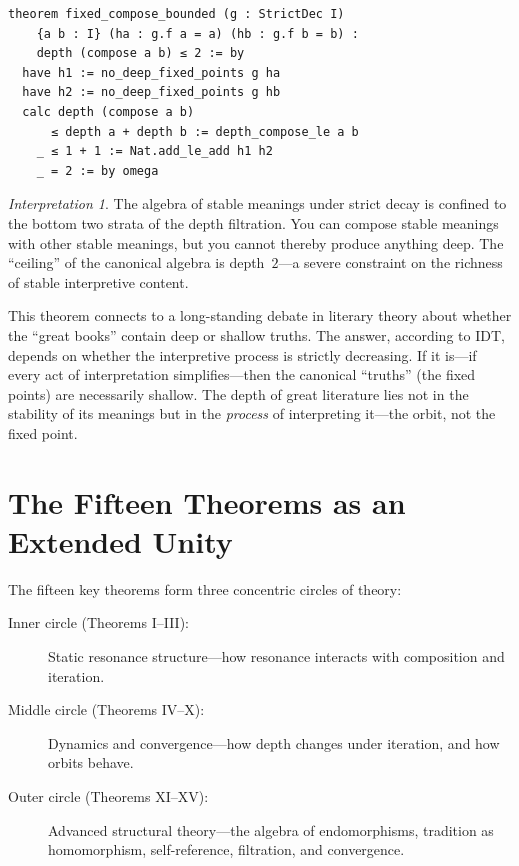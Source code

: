 \documentclass[11pt,openany]{book}
\theoremstyle{definition}
\theoremstyle{plain}
\theoremstyle{remark}
\newtheorem{interpretation}[axiom]{Interpretation}
\begin{document}
\begin{lstlisting}[language=Lean4]
theorem fixed_compose_bounded (g : StrictDec I)
    {a b : I} (ha : g.f a = a) (hb : g.f b = b) :
    depth (compose a b) ≤ 2 := by
  have h1 := no_deep_fixed_points g ha
  have h2 := no_deep_fixed_points g hb
  calc depth (compose a b)
      ≤ depth a + depth b := depth_compose_le a b
    _ ≤ 1 + 1 := Nat.add_le_add h1 h2
    _ = 2 := by omega
\end{lstlisting}

\begin{interpretation}
The algebra of stable meanings under strict decay is confined to the bottom two strata of the depth filtration. You can compose stable meanings with other stable meanings, but you cannot thereby produce anything deep. The ``ceiling'' of the canonical algebra is depth~$2$---a severe constraint on the richness of stable interpretive content.

This theorem connects to a long-standing debate in literary theory about whether the ``great books'' contain deep or shallow truths. The answer, according to IDT, depends on whether the interpretive process is strictly decreasing. If it is---if every act of interpretation simplifies---then the canonical ``truths'' (the fixed points) are necessarily shallow. The depth of great literature lies not in the stability of its meanings but in the \emph{process} of interpreting it---the orbit, not the fixed point.
\end{interpretation}

\section{The Fifteen Theorems as an Extended Unity}

The fifteen key theorems form three concentric circles of theory:

\begin{description}
\item[Inner circle (Theorems I--III):] Static resonance structure---how resonance interacts with composition and iteration.
\item[Middle circle (Theorems IV--X):] Dynamics and convergence---how depth changes under iteration, and how orbits behave.
\item[Outer circle (Theorems XI--XV):] Advanced structural theory---the algebra of endomorphisms, tradition as homomorphism, self-reference, filtration, and convergence.
\end{description}
\end{document}
